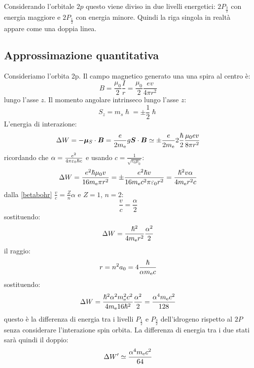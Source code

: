 Considerando l'orbitale $2p$ questo viene diviso in due livelli energetici: $2P_{\frac{3}{2}}$ con energia maggiore e $2P_{\frac{1}{2}}$ con energia minore. Quindi la riga singola in realtà appare come una doppia linea.
\subsection{Approssimazione quantitativa}
Consideriamo l'orbita 2p. Il campo magnetico generato una una spira al centro è:
\begin{equation}
	B=\frac{\mu_0}{2}\frac{I}{r}=\frac{\mu_0}{2}\frac{ev}{4\pi r^2}
\end{equation}
lungo l'asse $z$. Il momento angolare intrinseco lungo l'asse $z$:
\begin{equation}
	S_z=m_s\hslash=\pm\frac{1}{2}\hslash
\end{equation}
L'energia di interazione:
\begin{equation}
	\Delta W=-\boldsymbol{\mu}_S\cdot\boldsymbol{B}=\frac{e}{2m_{\mathrm{e}}}g\boldsymbol{S}\cdot\boldsymbol{B}\simeq\pm\frac{e}{2m_{\mathrm{e}}}2\frac{\hslash}{2}\frac{\mu_0ev}{8\pi r^2}
\end{equation}
ricordando che $\alpha=\frac{e^2}{4\pi\varepsilon_0\hslash c}$ e usando $c=\frac{1}{\sqrt{\varepsilon_0\mu_0}}$:
\begin{equation}
	\Delta W=\frac{e^2\hslash\mu_0v}{16m_{\mathrm{e}}\pi r^2}=\pm\frac{e^2\hslash v}{16m_{\mathrm{e}} c^2\pi\varepsilon_0 r^2}=\frac{\hslash^2v\alpha}{4m_{\mathrm{e}} r^2 c}
\end{equation}
dalla \eqref{betabohr} $\frac{v}{c}=\frac{Z}{n}\alpha$ e $Z=1$, $n=2$:
\begin{equation}
	\frac{v}{c}=\frac{\alpha}{2}
\end{equation}
sostituendo:
\begin{equation}
	\Delta W=\frac{\hslash^2}{4m_{\mathrm{e}} r^2}\frac{\alpha^2}{2}
\end{equation}
il raggio:
\begin{equation}
	r=n^2a_0=4\frac{\hslash }{\alpha m_{\mathrm{e}} c}
\end{equation}
sostituendo:
\begin{equation}
	\Delta W=\frac{\hslash^2\alpha^2 m_{\mathrm{e}}^2 c^2}{4m_{\mathrm{e}} 16\hslash^2}\frac{\alpha^2}{2}=\frac{\alpha^4m_{\mathrm{e}} c^2}{128}
\end{equation}
questo è la differenza di energia tra i livelli $P_\frac{1}{2}$ e $P_\frac{3}{2}$ dell'idrogeno rispetto al $2P$ senza considerare l'interazione spin orbita. La differenza di energia tra i due stati sarà quindi il doppio:
\begin{equation}
	\Delta W'\simeq\frac{\alpha^4m_{\mathrm{e}} c^2}{64}
\end{equation}

